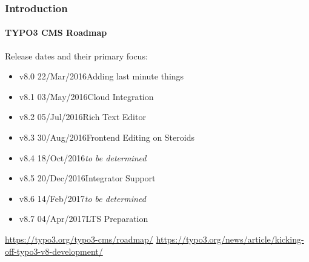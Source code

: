 \begin{frame}[fragile]
	\frametitle{Introduction}
	\framesubtitle{TYPO3 CMS Roadmap}

	Release dates and their primary focus:

	\begin{itemize}

		\item
			\begingroup
				\color{typo3orange}
					v8.0 \tabto{1.1cm}22/Mar/2016\tabto{3.4cm}Adding last minute things
			\endgroup
		\item v8.1 \tabto{1.1cm}03/May/2016\tabto{3.4cm}Cloud Integration
		\item v8.2 \tabto{1.1cm}05/Jul/2016\tabto{3.4cm}Rich Text Editor
		\item v8.3 \tabto{1.1cm}30/Aug/2016\tabto{3.4cm}Frontend Editing on Steroids
		\item v8.4 \tabto{1.1cm}18/Oct/2016\tabto{3.4cm}\textit{to be determined}
		\item v8.5 \tabto{1.1cm}20/Dec/2016\tabto{3.4cm}Integrator Support
		\item v8.6 \tabto{1.1cm}14/Feb/2017\tabto{3.4cm}\textit{to be determined}
		\item v8.7 \tabto{1.1cm}04/Apr/2017\tabto{3.4cm}LTS Preparation

	\end{itemize}

	\smaller
		\url{https://typo3.org/typo3-cms/roadmap/}\newline
		\url{https://typo3.org/news/article/kicking-off-typo3-v8-development/}
	\normalsize

\end{frame}

